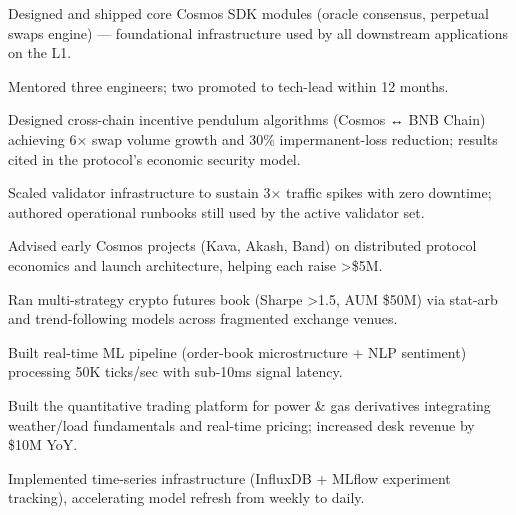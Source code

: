 \documentclass[]{plushcv}
\begin{document}
\begin{minipage}[t]{0.70\textwidth}
\begin{tightemize}
\sectionsep
\item Designed and shipped core Cosmos SDK modules (oracle consensus, perpetual swaps engine) — foundational infrastructure used by all downstream applications on the L1.
\item Mentored three engineers; two promoted to tech-lead within 12 months.
\end{tightemize}
\sectionsep

\begin{tightemize}
\sectionsep
\item Designed cross-chain incentive pendulum algorithms (Cosmos ↔ BNB Chain) achieving 6× swap volume growth and 30\% impermanent-loss reduction; results cited in the protocol's economic security model.
\item Scaled validator infrastructure to sustain 3× traffic spikes with zero downtime; authored operational runbooks still used by the active validator set.
\item Advised early Cosmos projects (Kava, Akash, Band) on distributed protocol economics and launch architecture, helping each raise >\$5M.
\end{tightemize}
\sectionsep

\begin{tightemize}
\sectionsep
\item Ran multi-strategy crypto futures book (Sharpe >1.5, AUM \$50M) via stat-arb and trend-following models across fragmented exchange venues.
\item Built real-time ML pipeline (order-book microstructure + NLP sentiment) processing 50K ticks/sec with sub-10ms signal latency.
\end{tightemize}
\sectionsep

\begin{tightemize}
\sectionsep
\item Built the quantitative trading platform for power \& gas derivatives integrating weather/load fundamentals and real-time pricing; increased desk revenue by \$10M YoY.
\item Implemented time-series infrastructure (InfluxDB + MLflow experiment tracking), accelerating model refresh from weekly to daily.
\end{tightemize}
\sectionsep



\end{minipage}
\end{document}

